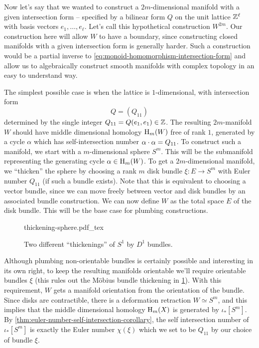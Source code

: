 Now let's say that we wanted to construct a $2m$-dimensional manifold with a given intersection form -- specified by a bilinear form $Q$ on the unit lattice $\mathbb{Z}^\ell$ with basis vectors $e_1,\ldots, e_\ell$. Let's call this hypothetical construction $W^{2m}$. Our construction here will allow $W$ to have a boundary, since constructing closed manifolds with a given intersection form is generally harder.
Such a construction would be a partial inverse to \cref{eq:monoid-homomorphism-intersection-form} and allow us to algebraically construct smooth manifolds with complex topology in an easy to understand way.

The simplest possible case is when the lattice is $1$-dimensional, with intersection form
\[
	Q =  (Q_{11})
\]
determined by the single integer $Q_{11}=Q(e_1,e_1)\in \mathbb{Z}$.
The resulting $2m$-manifold $W$ should have middle dimensional homology $\operatorname{H}_m(W)$ free of rank $1$, generated by a cycle $\alpha$ which has self-intersection number $\alpha\cdot \alpha = Q_{11}$. To construct such a manifold, we start with a $m$-dimensional sphere $S^m$. This will be the submanifold representing the generating cycle $\alpha\in \operatorname{H}_m(W)$. To get a $2m$-dimensional manifold, we ``thicken'' the sphere by choosing a rank $m$ disk bundle $\xi : E \to S^m$ with Euler number $Q_{11}$ (if such a bundle exists). Note that this is equivalent to choosing a vector bundle, since we can move freely between vector and disk bundles by an associated bundle construction. We can now define $W$ as the total space $E$ of the disk bundle. This will be the base case for plumbing constructions.
\begin{figure}[ht]
	\centering
	{thickening-sphere.pdf_tex}
	\caption{Two different ``thickenings'' of $S^1$ by $D^1$ bundles.}\label{fig:thickening-sphere}
\end{figure}

Although plumbing non-orientable bundles is certainly possible and interesting in its own right, to keep the resulting manifolds orientable we'll require orientable bundles $\xi$ (this rules out the M\"obius bundle thickening in \cref{fig:thickening-sphere}). With this requirement, $W$ gets a manifold orientation from the orientation of the bundle.
Since disks are contractible, there is a deformation retraction $W\simeq S^m$, and this implies that the middle dimensional homology $\operatorname{H}_m(X)$ is generated by $\iota_*[S^m]$. By \cref{thm:euler-number-self-intersection-corollary}, the self intersection number of $\iota_*[S^m]$ is exactly the Euler number $\chi(\xi)$ which we set to be $Q_{11}$ by our choice of bundle $\xi$.

